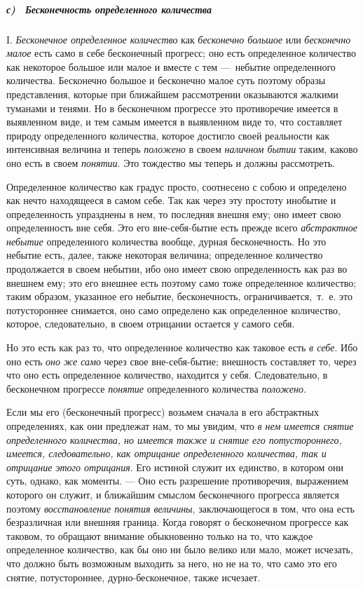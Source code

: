 {\subparagraph[с) \ Бесконечность определенного количества]{с)
\ Бесконечность определенного количества}
I. {\em Бесконечное определенное количество} как
{\em бесконечно большое} или
{\em бесконечно малое} есть само в себе бесконечный
прогресс; оно есть определенное количество как некоторое большое или малое
и вместе с тем —~небытие определенного количества. Бесконечно большое и
бесконечно малое суть поэтому образы представления, которые при ближайшем
рассмотрении оказываются жалкими туманами и тенями. Но в бесконечном
прогрессе это противоречие имеется в выявленном виде, и тем самым имеется в
выявленном виде то, что составляет природу определенного количества,
которое достигло своей реальности как интенсивная величина и теперь
{\em положено} в своем
{\em наличном бытии} таким, каково оно есть в своем
{\em понятии}. Это тождество мы теперь и должны
рассмотреть.

Определенное количество как градус просто, соотнесено с собою и определено
как нечто находящееся в самом себе. Так как через эту простоту инобытие и
определенность упразднены в нем, то последняя внешня ему; оно имеет свою
определенность вне себя. Это его вне-себя-бытие есть прежде всего
{\em абстрактное небытие} определенного количества
вообще, дурная бесконечность. Но это небытие есть, далее, также некоторая
величина; определенное количество продолжается в своем небытии, ибо оно
имеет свою определенность как раз во внешнем ему; это его внешнее есть
поэтому само тоже определенное количество; таким образом, указанное его
небытие, бесконечность, ограничивается,~т.~е. это потустороннее снимается,
оно само определено как определенное количество, которое, следовательно, в
своем отрицании остается у самого себя.

Но это есть как раз то, что определенное количество как таковое есть
{\em в себе}. Ибо оно есть {\em оно
же само} через свое вне-себя-бытие; внешность составляет то, через что оно
есть определенное количество, находится у себя. Следовательно, в
бесконечном прогрессе {\em понятие} определенного
количества {\em положено}.

Если мы его (бесконечный прогресс) возьмем сначала в его абстрактных
определениях, как они предлежат нам, то мы увидим, что
{\em в нем имеется снятие определенного количества, но
имеется также и снятие его потустороннего, имеется, следовательно, как
отрицание определенного количества, так и отрицание этого отрицания}. Его
истиной служит их единство, в котором они суть, однако, как моменты. — Оно
есть разрешение противоречия, выражением которого он служит, и ближайшим
смыслом бесконечного прогресса является поэтому
{\em восстановление понятия величины}, заключающегося в
том, что она есть безразличная или внешняя граница. Когда говорят о
бесконечном прогрессе как таковом, то обращают внимание обыкновенно только
на то, что каждое определенное количество, как бы оно ни было велико или
мало, может исчезать, что должно быть возможным выходить за него, но не на
то, что само это его снятие, потустороннее, дурно-бесконечное, также
исчезает.

}
